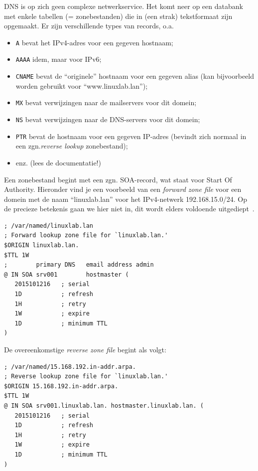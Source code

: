 DNS is op zich geen complexe netwerkservice. Het komt neer op een databank met enkele tabellen (= zonebestanden) die in (een strak) tekstformaat zijn opgemaakt. Er zijn verschillende types van records, o.a.

\begin{itemize}
\item \texttt{A} bevat het IPv4-adres voor een gegeven hostnaam;
\item \texttt{AAAA} idem, maar voor IPv6;
\item \texttt{CNAME} bevat de ``originele'' hostnaam voor een gegeven alias (kan bijvoorbeeld worden gebruikt voor ``www.linuxlab.lan'');
\item \texttt{MX} bevat verwijzingen naar de mailservers voor dit domein;
\item \texttt{NS} bevat verwijzingen naar de DNS-servers voor dit domein;
\item \texttt{PTR} bevat de hostnaam voor een gegeven IP-adres (bevindt zich normaal in een zgn.\emph{reverse lookup} zonebestand);
\item enz. (lees de documentatie!)
\end{itemize}

Een zonebestand begint met een zgn. SOA-record, wat staat voor Start Of Authority. Hieronder vind je een voorbeeld van een \emph{forward zone file} voor een domein met de naam ``linuxlab.lan'' voor het IPv4-netwerk 192.168.15.0/24. Op de precieze betekenis gaan we hier niet in, dit wordt elders voldoende uitgediept~\autocite{Aitchison2015}.

\begin{verbatim}
; /var/named/linuxlab.lan
; Forward lookup zone file for `linuxlab.lan.'
$ORIGIN linuxlab.lan.
$TTL 1W
;        primary DNS   email address admin
@ IN SOA srv001        hostmaster (
   2015101216   ; serial
   1D           ; refresh
   1H           ; retry
   1W           ; expire
   1D           ; minimum TTL
)
\end{verbatim}

De overeenkomstige \emph{reverse zone file} begint als volgt:

\begin{verbatim}
; /var/named/15.168.192.in-addr.arpa.
; Reverse lookup zone file for `linuxlab.lan.'
$ORIGIN 15.168.192.in-addr.arpa.
$TTL 1W
@ IN SOA srv001.linuxlab.lan. hostmaster.linuxlab.lan. (
   2015101216   ; serial
   1D           ; refresh
   1H           ; retry
   1W           ; expire
   1D           ; minimum TTL
)
\end{verbatim}

